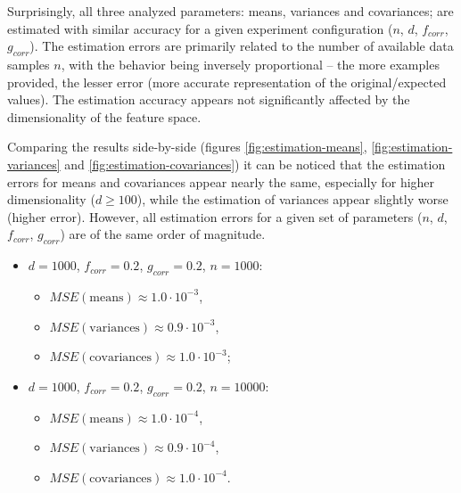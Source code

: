 Surprisingly, all three analyzed parameters: means, variances and covariances; are estimated with similar accuracy for a given experiment configuration ($n$, $d$, $f_{corr}$, $g_{corr}$). The estimation errors are primarily related to the number of available data samples $n$, with the behavior being inversely proportional – the more examples provided, the lesser error (more accurate representation of the original/expected values). The estimation accuracy appears not significantly affected by the dimensionality of the feature space.

Comparing the results side-by-side (figures \ref{fig:estimation-means}, \ref{fig:estimation-variances} and \ref{fig:estimation-covariances}) it can be noticed that the estimation errors for means and covariances appear nearly the same, especially for higher dimensionality ($d \geq 100$), while the estimation of variances appear slightly worse (higher error). However, all estimation errors for a given set of parameters ($n$, $d$, $f_{corr}$, $g_{corr}$) are of the same order of magnitude.

\clearpage  %

\begin{itemize}
    \item $d = 1000$, $f_{corr} = 0.2$, $g_{corr} = 0.2$, $n = 1000$:
          \begin{itemize}
              \item $MSE( \text{means} ) \approx 1.0 \cdot 10^{-3}$,
              \item $MSE( \text{variances} ) \approx 0.9 \cdot 10^{-3}$,
              \item $MSE( \text{covariances} ) \approx 1.0 \cdot 10^{-3}$;
          \end{itemize}
    \item $d = 1000$, $f_{corr} = 0.2$, $g_{corr} = 0.2$, $n = 10000$:
          \begin{itemize}
              \item $MSE( \text{means} ) \approx 1.0 \cdot 10^{-4}$,
              \item $MSE( \text{variances} ) \approx 0.9 \cdot 10^{-4}$,
              \item $MSE( \text{covariances} ) \approx 1.0 \cdot 10^{-4}$.
          \end{itemize}
\end{itemize}


